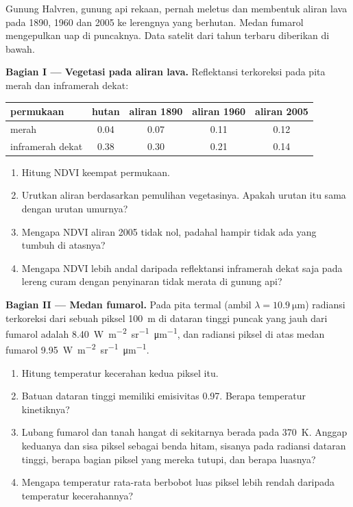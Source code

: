 \begin{problem}
\label{pb:b3:remote-sensing-gis:1}
Gunung Halvren, gunung api rekaan, pernah meletus dan membentuk aliran lava pada 1890, 1960
dan 2005 ke lerengnya yang berhutan. Medan fumarol mengepulkan uap di puncaknya.
Data satelit dari tahun terbaru diberikan di bawah.

\medskip\noindent\textbf{Bagian I --- Vegetasi pada aliran lava.} Reflektansi terkoreksi
pada pita merah dan inframerah dekat:
\begin{center}
\small
\begin{tabular}{lcccc}
\hline
permukaan & hutan & aliran 1890 & aliran 1960 & aliran 2005 \\
\hline
merah & 0.04 & 0.07 & 0.11 & 0.12 \\
inframerah dekat & 0.38 & 0.30 & 0.21 & 0.14 \\
\hline
\end{tabular}
\end{center}
\begin{enumerate}
\item Hitung NDVI keempat permukaan.
\item Urutkan aliran berdasarkan pemulihan vegetasinya. Apakah urutan itu
  sama dengan urutan umurnya?
\item Mengapa NDVI aliran 2005 tidak nol, padahal hampir
  tidak ada yang tumbuh di atasnya?
\item Mengapa NDVI lebih andal daripada reflektansi inframerah dekat
  saja pada lereng curam dengan penyinaran tidak merata di gunung api?
\end{enumerate}

\medskip\noindent\textbf{Bagian II --- Medan fumarol.} Pada pita termal
(ambil $\lambda = \qty{10.9}{\micro\metre}$) radiansi terkoreksi dari
sebuah piksel \qty{100}{m} di dataran tinggi puncak yang jauh dari fumarol adalah
\qty{8.40}{W.m^{-2}.sr^{-1}.\micro\metre^{-1}}, dan radiansi piksel di atas
medan fumarol \qty{9.95}{W.m^{-2}.sr^{-1}.\micro\metre^{-1}}.
\begin{enumerate}[resume]
\item Hitung temperatur kecerahan kedua piksel itu.
\item Batuan dataran tinggi memiliki emisivitas 0.97. Berapa
  temperatur kinetiknya?
\item Lubang fumarol dan tanah hangat di sekitarnya berada pada
  \qty{370}{K}. Anggap keduanya dan sisa piksel sebagai benda hitam,
  sisanya pada radiansi dataran tinggi, berapa bagian piksel yang mereka
  tutupi, dan berapa luasnya?
\item Mengapa temperatur rata-rata berbobot luas piksel lebih rendah
  daripada temperatur kecerahannya?
\end{enumerate}


\end{problem}
